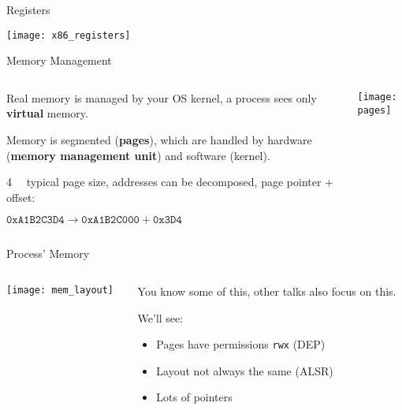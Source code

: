 \documentclass[beamer]{uibk}
\begin{document}
\begin{frame}{Registers}
    \begin{center}
        \texttt{[image: x86\_registers]}
    \end{center}
\end{frame}

\begin{frame}{Memory Management}
    \begin{columns}
        \begin{column}{0.45\textwidth}
            Real memory is managed by your OS kernel, a process sees only
            \textbf{virtual} memory.

            \medskip

            Memory is segmented (\textbf{pages}), which are handled by hardware
            (\textbf{memory management unit}) and software (kernel).

            \medskip

            \SI{4}{\kibi\byte} typical page size, addresses can be decomposed,
            page pointer + offset:

            $\mathtt{0xA1B2C3D4} \to \texttt{0xA1B2C000} + \mathtt{0x3D4}$
        \end{column}
        \begin{column}{0.55\textwidth}
            \texttt{[image: pages]}
        \end{column}
    \end{columns}
\end{frame}

\begin{frame}{Process' Memory}
    \begin{columns}
        \begin{column}{0.5\textwidth}
            \begin{center}
                \texttt{[image: mem\_layout]}
            \end{center}
        \end{column}
        \begin{column}{0.5\textwidth}
            You know some of this, other talks also focus on this.

            \bigskip

            We'll see:
            \begin{itemize}
                \item Pages have permissions \texttt{rwx} (DEP)
                \item Layout not always the same (ALSR)
                \item Lots of pointers
            \end{itemize}
        \end{column}
    \end{columns}
\end{frame}
\end{document}
